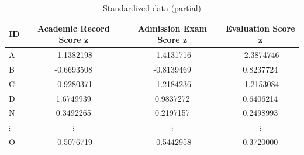 \begin{table}[ht]
	\caption{Standardized data (partial)}
	\centering
	\begin{tabular}[t]{l|ccc}
		\hline
		ID       & Academic Record Score z & Admission Exam Score z & Evaluation Score z \\
		\hline
		A        & -1.1382198              & -1.4131716             & -2.3874746         \\
		B        & -0.6693508              & -0.8139469             & 0.8237724          \\
		C        & -0.9280371              & -1.2184236             & -1.2153084         \\
		D        & 1.6749939               & 0.9837272              & 0.6406214          \\
		N        & 0.3492265               & 0.2197157              & 0.2498993          \\
		$\vdots$ & $\vdots$                & $\vdots$               & $\vdots$           \\
		O        & -0.5076719              & -0.5442958             & 0.3720000          \\
		\hline
	\end{tabular}
	\label{tbl::10_03}
\end{table}
